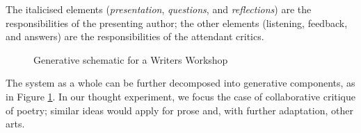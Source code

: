 The italicised elements (\emph{presentation}, \emph{questions}, and
\emph{reflections}) are the responsibilities of the presenting author; the other
elements (listening, feedback, and answers) are the responsibilities of the attendant critics.
%
\begin{figure}[b]
{\centering


\par}
\caption{Generative schematic for a Writers Workshop\label{fig:generative-diagram}}
\end{figure}
%
The system as a whole can be further decomposed into generative
components, as in Figure \ref{fig:generative-diagram}.  In our thought
experiment, we focus the case of collaborative critique of poetry;
similar ideas would apply for prose and, with further adaptation,
other arts.\\
